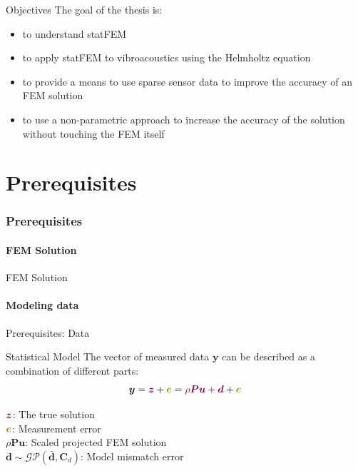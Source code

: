 \documentclass[fleqn,11pt,aspectratio=43]{beamer}
\begin{document}
\begin{frame}{Objectives}
The goal of the thesis is:
\begin{itemize}
	\item to understand statFEM
 	\item to apply statFEM to vibroacoustics using the Helmholtz equation
  \item to provide a means to use sparse sensor data to improve the accuracy of an FEM solution
  \item to use a non-parametric approach to increase the accuracy of the solution without touching the FEM itself
\end{itemize}

\end{frame}

\part{Prerequisites}
\begin{frame}[plain]
  \partpage
\end{frame}





\section{Prerequisites}




\subsection{FEM Solution}
\begin{frame}{FEM Solution}

	
\end{frame}



\subsection{Modeling data}
\begin{frame}{Prerequisites: Data}

\begin{block}{Statistical Model}
The vector of measured data $\bm{y}$ can be described as a combination of different parts:
\begin{equation}
\bm{y} = \textcolor{DGTU}{\bm{z}} + \textcolor{olive}{\bm{e}} = \textcolor{DGTU}{\rho \bm{P} \bm{u} + \bm{d}} + \textcolor{olive}{\bm{e}}
\end{equation}
\end{block}
$\textcolor{DGTU}{\bm{z}}$: The true solution\\
$\textcolor{olive}{\bm{e}}$: Measurement error\\
$\rho \bm{P} \bm{u}$: Scaled projected FEM solution\\

$\bm{d} \sim \mathcal{GP}(\bar{\bm{d}}, \bm{C}_d)$: Model mismatch error
\end{frame}
\end{document}
